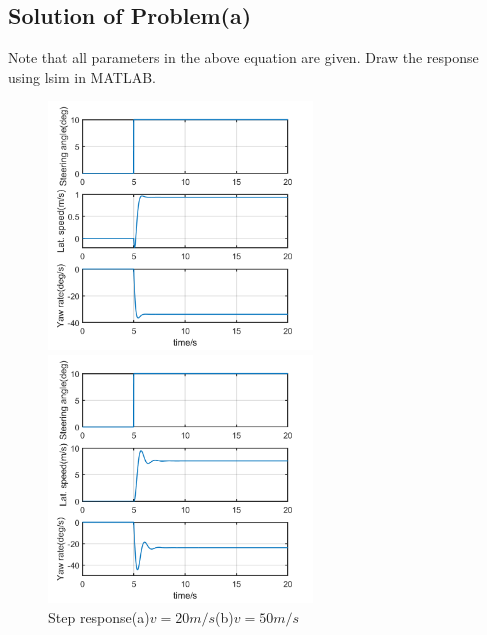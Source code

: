 \documentclass[UTF8,a4paper,11pt]{article}
\begin{document}
\subsection{Solution of Problem(a)}
Note that all parameters in the above equation are given. Draw the response using lsim in MATLAB.
  \begin{figure}[htbp]
  	\begin{minipage}[t]{0.45\linewidth}
  		\centering
  		\includegraphics[width=7cm]{./figures/v20.png}
  	\end{minipage}
  	\begin{minipage}[t]{0.45\linewidth}        %
  		\hspace{2mm}
  		\includegraphics[width=7cm]{./figures/v50.png}
  	\end{minipage}
  	\caption{Step response(a)$v=20m/s$(b)$v=50m/s$}
  \end{figure}
\end{document}
